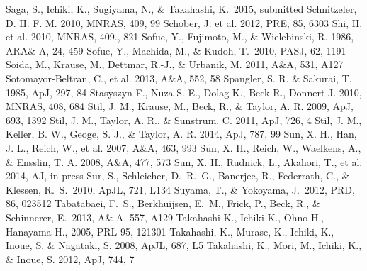 \begin{thebibliography}{99}
\begin{multicols}{2}
{
	Saga, S., Ichiki, K., Sugiyama, N., \& Takahashi, K.\ 2015, submitted
	Schnitzeler, D. H. F. M. 2010, MNRAS, 409, 99
	Schober, J. et al. 2012, PRE, 85, 6303
	Shi, H. et al. 2010, MNRAS, 409., 821
	Sofue, Y., Fujimoto, M., \& Wielebinski, R. 1986, ARA\& A, 24, 459 
	Sofue, Y., Machida, M.,  \& Kudoh, T.\ 2010, PASJ, 62, 1191 
	Soida, M., Krause, M., Dettmar, R.-J., \& Urbanik, M. 2011, A\&A, 531, A127
	Sotomayor-Beltran, C., et al. 2013, A\&A, 552, 58
	Spangler, S. R. \& Sakurai, T. 1985, ApJ, 297, 84
	Stasyszyn F., Nuza S. E., Dolag K., Beck R., Donnert J. 2010, MNRAS, 408, 684
	Stil, J. M., Krause, M., Beck, R., \& Taylor, A. R. 2009, ApJ, 693, 1392
	Stil, J. M., Taylor, A. R., \& Sunstrum, C. 2011, ApJ, 726, 4
	Stil, J. M., Keller, B. W., Geoge, S. J., \& Taylor, A. R. 2014, ApJ, 787, 99
	Sun, X. H., Han, J. L., Reich, W., et al. 2007, A\&A, 463, 993
	Sun, X. H., Reich, W., Waelkens, A., \& Ensslin, T. A. 2008, A\&A, 477, 573
	Sun, X. H., Rudnick, L., Akahori, T., et al. 2014, AJ, in press
	Sur, S., Schleicher, D.~R.~G., Banerjee, R., Federrath, C., \& Klessen, R.~S.\ 2010, ApJL, 721, L134 
	Suyama, T., \& Yokoyama, J.\ 2012, PRD, 86, 023512
	Tabatabaei, F.~S., Berkhuijsen, E.~M., Frick, P., Beck, R., \& Schinnerer, E.\ 2013, A\& A, 557, A129 
	Takahashi K., Ichiki K., Ohno H., Hanayama H., 2005, PRL 95, 121301
	Takahashi, K., Murase, K., Ichiki, K., Inoue, S. \& Nagataki, S. 2008, ApJL, 687, L5
	Takahashi, K., Mori, M., Ichiki, K., \& Inoue, S. 2012, ApJ, 744, 7
}
\end{multicols}
\end{thebibliography}
